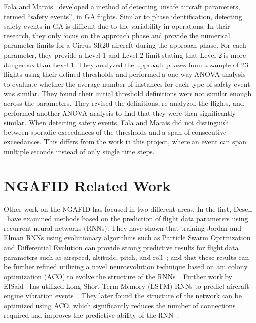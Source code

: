     Fala and Marais~\cite{fala2016detecting} developed a method of detecting unsafe aircraft parameters, termed ``safety events'', in GA flights.  Similar to phase identification, detecting safety events in GA is difficult due to the variability in operations.  In their research, they only focus on the approach phase and provide the numerical parameter limits for a Cirrus SR20 aircraft during the approach phase.  For each parameter, they provide a Level 1 and Level 2 limit stating that Level 2 is more dangerous than Level 1.  They analyzed the approach phases from a sample of 23 flights using their defined thresholds and performed a one-way ANOVA analysis to evaluate whether the average number of instances for each type of safety event was similar.  They found their initial threshold definitions were not similar enough across the parameters.  They revised the definitions, re-analyzed the flights, and performed another ANOVA analysis to find that they were then significantly similar.  When detecting safety events, Fala and Marais did not distinguish between sporadic exceedances of the thresholds and a span of consecutive exceedances.  This differs from the work in this project, where an event can span multiple seconds instead of only single time steps.
	

\section{NGAFID Related Work}

	Other work on the NGAFID has focused in two different areas.  In the first, Desell \etal\ have examined methods based on the prediction of flight data parameters using recurrent neural networks (RNNs).  They have shown that training Jordan and Elman RNNs using evolutionary algorithms such as Particle Swarm Optimization and Differential Evolution can provide strong predictive results for flight data parameters such as airspeed, altitude, pitch, and roll~\cite{desell2014evolving}; and that these results can be further refined utilizing a novel neuroevolution technique based on ant colony optimization (ACO) to evolve the structure of the RNNs~\cite{desell2015evolving}.  Further work by ElSaid \etal\ has utilized Long Short-Term Memory (LSTM) RNNs to predict aircraft engine vibration events~\cite{elsaid2016vibration,elsaid2016thesis}.  They later found the structure of the network can be optimized using ACO, which significantly reduces the number of connections required and improves the predictive ability of the RNN~\cite{elsaid2018using}.
    
